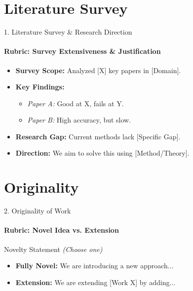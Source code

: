\documentclass[aspectratio=169, 11pt]{beamer}
\begin{document}
\section{Literature Survey}
\begin{frame}{1. Literature Survey \& Research Direction}
    \framesubtitle{Rubric: Survey Extensiveness \& Justification}
    \begin{itemize}
        \item \textbf{Survey Scope:} Analyzed [X] key papers in [Domain].
        \item \textbf{Key Findings:}
        \begin{itemize}
            \item \textit{Paper A:} Good at X, fails at Y.
            \item \textit{Paper B:} High accuracy, but slow.
        \end{itemize}
        \item \textbf{Research Gap:} Current methods lack [Specific Gap].
        \item \textbf{Direction:} We aim to solve this using [Method/Theory].
    \end{itemize}
\end{frame}

\section{Originality}
\begin{frame}{2. Originality of Work}
    \framesubtitle{Rubric: Novel Idea vs. Extension}
    \begin{block}{Novelty Statement}
        \textit{(Choose one)}
        \begin{itemize}
            \item \textbf{Fully Novel:} We are introducing a new approach...
            \item \textbf{Extension:} We are extending [Work X] by adding...
        \end{itemize}
    \end{block}
\end{frame}

\end{document}
